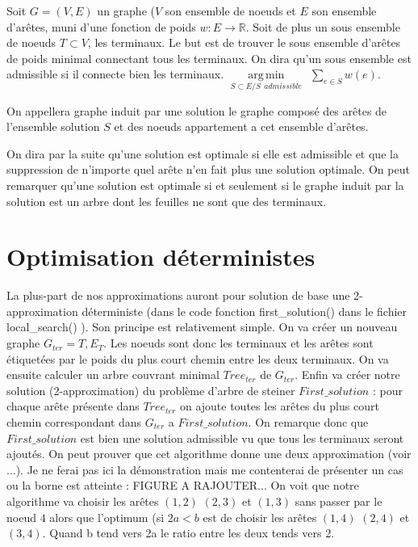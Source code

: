 \documentclass[10pt,a4paper]{article}
\DeclareMathOperator*{\argmin}{arg\,min}
\begin{document}
Soit $G = (V,E)$ un graphe ($V$ son ensemble de noeuds et $E$ son ensemble d'arêtes, muni d'une fonction de poids $w:E\rightarrow \mathbb{R}$. Soit de plus un sous ensemble de noeuds $T \subset V$, les terminaux. Le but est de trouver le sous ensemble d'arêtes de poids minimal connectant tous les terminaux. On dira qu'un sous ensemble est admissible si il connecte bien les terminaux.  $\argmin\limits_{S\subset E / S ~~admissible} ~~ \sum\limits_{e\in S} w(e) $. 

On appellera graphe induit par une solution le graphe composé des arêtes de l'ensemble solution $S$ et des noeuds appartement a cet ensemble d'arêtes. 

On dira par la suite qu'une solution est optimale si elle est admissible et que la suppression de n'importe quel arête n'en fait plus une solution optimale. On peut remarquer qu'une solution est optimale si et seulement si le graphe induit par la solution est un arbre dont les feuilles ne sont que des terminaux. 

\section{Optimisation déterministes}

La plus-part de nos approximations auront pour solution de base une 2-approximation déterministe (dans le code fonction first\_solution() dans le fichier local\_search() ).
Son principe est relativement simple. On va créer un nouveau graphe $G_{ter} = {T, E_T}$. Les noeuds sont donc les terminaux et les arêtes sont étiquetées par le poids du plus court chemin entre les deux terminaux. On va ensuite calculer un arbre couvrant minimal $Tree_{ter}$ de $G_{ter}$. Enfin va créer notre solution (2-approximation) du problème d'arbre de steiner $First\_solution$ :  pour chaque arête présente dans $Tree_{ter}$ on ajoute toutes les arêtes du plus court chemin correspondant dans $G_{ter} $ a $First\_solution$. On remarque donc que $First\_solution$ est bien une solution admissible vu que tous les terminaux seront ajoutés. On peut prouver que cet algorithme donne une deux approximation (voir ...). Je ne ferai pas ici la démonstration mais me contenterai de présenter un cas ou la borne est atteinte : FIGURE A RAJOUTER... On voit que notre algorithme va choisir les arêtes $(1,2)$ $(2,3)$ et $(1,3)$ sans passer par le noeud $4$ alors que l'optimum (si $2a<b$ est de choisir les arêtes $(1,4)$ $(2,4)$ et $(3,4)$. Quand b tend vers 2a le ratio entre les deux tends vers 2.
\end{document}
